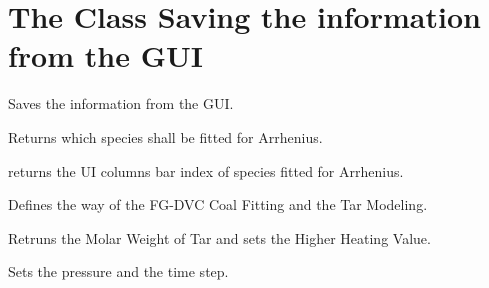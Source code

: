 \documentclass[letterpaper,10pt,english]{sphinxmanual}
\begin{document}
\section{The Class Saving the information from the GUI}
\label{GUI:the-class-saving-the-information-from-the-gui}

\begin{fulllineitems}
\label{GUI:GUI.InfosFromGUI}
Saves the information from the GUI.

\begin{fulllineitems}
\label{GUI:GUI.InfosFromGUI.ArrhSpec}
Returns which species shall be fitted for Arrhenius.

\end{fulllineitems}


\begin{fulllineitems}
\label{GUI:GUI.InfosFromGUI.ArrhSpecReverse}
returns the UI columns bar index of species fitted for Arrhenius.

\end{fulllineitems}


\begin{fulllineitems}
\label{GUI:GUI.InfosFromGUI.FGCoalProp}
Defines the way of the FG-DVC Coal Fitting and the Tar Modeling.

\end{fulllineitems}


\begin{fulllineitems}
\label{GUI:GUI.InfosFromGUI.MwsHHV}
Retruns the Molar Weight of Tar and sets the Higher Heating Value.

\end{fulllineitems}


\begin{fulllineitems}
\label{GUI:GUI.InfosFromGUI.OperCond}
Sets the pressure and the time step.


\end{fulllineitems}
\end{fulllineitems}
\end{document}
